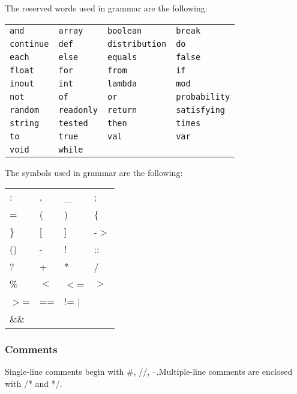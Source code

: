 \documentclass{article}
\begin{document}
The reserved words used in grammar are the following:

\begin{center}\begin{tabular}{llll}
\texttt{and} & \texttt{array} & \texttt{boolean} & \texttt{break} \\
\texttt{continue} & \texttt{def} & \texttt{distribution} & \texttt{do} \\
\texttt{each} & \texttt{else} & \texttt{equals} & \texttt{false} \\
\texttt{float} & \texttt{for} & \texttt{from} & \texttt{if} \\
\texttt{inout} & \texttt{int} & \texttt{lambda} & \texttt{mod} \\
\texttt{not} & \texttt{of} & \texttt{or} & \texttt{probability} \\
\texttt{random} & \texttt{readonly} & \texttt{return} & \texttt{satisfying} \\
\texttt{string} & \texttt{tested} & \texttt{then} & \texttt{times} \\
\texttt{to} & \texttt{true} & \texttt{val} & \texttt{var} \\
\texttt{void} & \texttt{while} &  \\
\end{tabular}\end{center}

The symbols used in grammar are the following:

\begin{center}\begin{tabular}{llll}
: & , & \_ & ; \\
= & ( & ) & \{ \\
\} & [ & ] & -$>$ \\
() & - & ! & :: \\
? & + & * & / \\
\% & $<$ & $<$= & $>$ \\
$>$= & == & \multicolumn{2}{l}{!= $|$} \\
\&\& &  &  \\
\end{tabular}\end{center}

\subsubsection*{Comments}

Single-line comments begin with \#, //, --.Multiple-line comments are  enclosed with /* and */.
\end{document}
